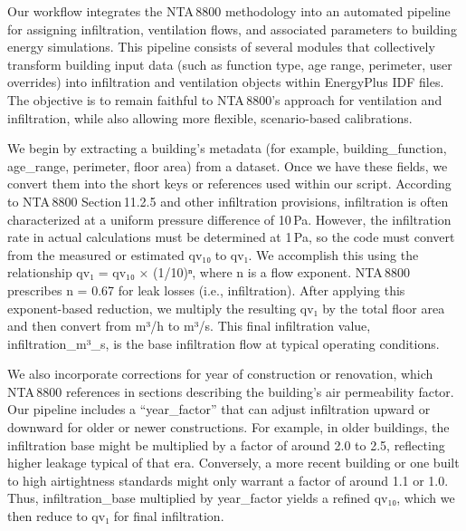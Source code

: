 Our workflow integrates the NTA 8800 methodology into an automated pipeline for assigning infiltration, ventilation flows, and associated parameters to building energy simulations. This pipeline consists of several modules that collectively transform building input data (such as function type, age range, perimeter, user overrides) into infiltration and ventilation objects within EnergyPlus IDF files. The objective is to remain faithful to NTA 8800’s approach for ventilation and infiltration, while also allowing more flexible, scenario-based calibrations.

We begin by extracting a building’s metadata (for example, building_function, age_range, perimeter, floor area) from a dataset. Once we have these fields, we convert them into the short keys or references used within our script. According to NTA 8800 Section 11.2.5 and other infiltration provisions, infiltration is often characterized at a uniform pressure difference of 10 Pa. However, the infiltration rate in actual calculations must be determined at 1 Pa, so the code must convert from the measured or estimated qv₁₀ to qv₁. We accomplish this using the relationship qv₁ = qv₁₀ × (1/10)ⁿ, where n is a flow exponent. NTA 8800 prescribes n = 0.67 for leak losses (i.e., infiltration). After applying this exponent-based reduction, we multiply the resulting qv₁ by the total floor area and then convert from m³/h to m³/s. This final infiltration value, infiltration_m³_s, is the base infiltration flow at typical operating conditions.

We also incorporate corrections for year of construction or renovation, which NTA 8800 references in sections describing the building’s air permeability factor. Our pipeline includes a “year_factor” that can adjust infiltration upward or downward for older or newer constructions. For example, in older buildings, the infiltration base might be multiplied by a factor of around 2.0 to 2.5, reflecting higher leakage typical of that era. Conversely, a more recent building or one built to high airtightness standards might only warrant a factor of around 1.1 or 1.0. Thus, infiltration_base multiplied by year_factor yields a refined qv₁₀, which we then reduce to qv₁ for final infiltration.

